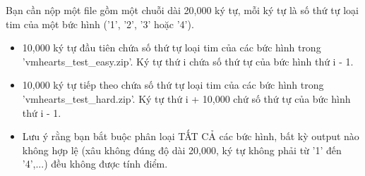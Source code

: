 Bạn cần nộp một file gồm một chuỗi dài 20,000 ký tự, mỗi ký tự là số thứ tự loại tim của một bức hình ('1', '2', '3' hoặc '4').
\begin{itemize}
	\item 10,000 ký tự đầu tiên chứa số thứ tự loại tim của các bức hình trong 'vmhearts\_test\_easy.zip'. Ký tự thứ i chứa số thứ tự của bức hình thứ i - 1. 
	\item 10,000 ký tự tiếp theo chứa số thứ tự loại tim của các bức hình trong 'vmhearts\_test\_hard.zip'. Ký tự thứ i + 10,000 chứ số thứ tự của bức hình thứ i - 1. 
	\item Lưu ý rằng bạn bắt buộc phân loại TẤT CẢ các bức hình, bất kỳ output nào không hợp lệ (xâu không đúng độ dài 20,000, ký tự không phải từ '1' đến '4',...) đều không được tính điểm. 
\end{itemize}